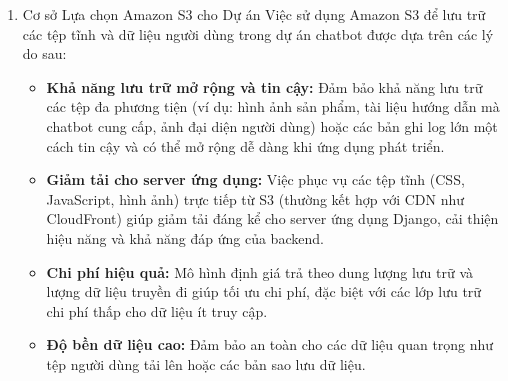 \begin{enumerate}[label=\arabic*., font=\bfseries]
    \item Cơ sở Lựa chọn Amazon S3 cho Dự án
    Việc sử dụng Amazon S3 để lưu trữ các tệp tĩnh và dữ liệu người dùng trong dự án chatbot được dựa trên các lý do sau:
    \begin{itemize}
        \item \textbf{Khả năng lưu trữ mở rộng và tin cậy:} Đảm bảo khả năng lưu trữ các tệp đa phương tiện (ví dụ: hình ảnh sản phẩm, tài liệu hướng dẫn mà chatbot cung cấp, ảnh đại diện người dùng) hoặc các bản ghi log lớn một cách tin cậy và có thể mở rộng dễ dàng khi ứng dụng phát triển.
        \item \textbf{Giảm tải cho server ứng dụng:} Việc phục vụ các tệp tĩnh (CSS, JavaScript, hình ảnh) trực tiếp từ S3 (thường kết hợp với CDN như CloudFront) giúp giảm tải đáng kể cho server ứng dụng Django, cải thiện hiệu năng và khả năng đáp ứng của backend.
        \item \textbf{Chi phí hiệu quả:} Mô hình định giá trả theo dung lượng lưu trữ và lượng dữ liệu truyền đi giúp tối ưu chi phí, đặc biệt với các lớp lưu trữ chi phí thấp cho dữ liệu ít truy cập.
        \item \textbf{Độ bền dữ liệu cao:} Đảm bảo an toàn cho các dữ liệu quan trọng như tệp người dùng tải lên hoặc các bản sao lưu dữ liệu.
    \end{itemize}
\end{enumerate}


